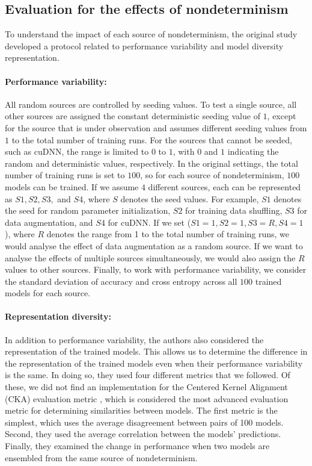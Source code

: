 \subsection{Evaluation for the effects of nondeterminism}
To understand the impact of each source of nondeterminism, the original study developed a protocol related to performance variability and model diversity representation. 
\paragraph{Performance variability:}
All random sources are controlled by seeding values. To test a single source, all other sources are assigned the constant deterministic seeding value of $1$, except for the source that is under observation and assumes different seeding values from $1$ to the total number of training runs. For the sources that cannot be seeded, such as cuDNN, the range is limited to $0$ to $1$, with $0$ and $1$ indicating the random and deterministic values, respectively. In the original settings, the total number of training runs is set to $100$, so for each source of nondeterminism, $100$ models can be trained. If we assume $4$ different sources, each can be represented as $S1, S2, S3,$ and $S4$, where $S$ denotes the seed values. For example, $S1$ denotes the seed for random parameter initialization, $S2$ for training data shuffling, $S3$ for data augmentation, and $S4$ for cuDNN. If we set ($S1=1, S2=1, S3=R, S4=1$), where $R$ denotes the range from 1 to the total number of training runs, we would analyse the effect of data augmentation as a random source. If we want to analyse the effects of multiple sources simultaneously, we would also assign the $R$ values to other sources. Finally, to work with performance variability, we consider the standard deviation of accuracy and cross entropy across all $100$ trained models for each source.
\paragraph{Representation diversity:}
In addition to performance variability, the authors also considered the representation of the trained models. This allows us to determine the difference in the representation of the trained models even when their performance variability is the same. In doing so, they used four different metrics that we followed. Of these, we did not find an implementation for the Centered Kernel Alignment (CKA) evaluation metric \cite{kornblith2019similarity}, which is considered the most advanced evaluation metric for determining similarities between models. The first metric is the simplest, which uses the average disagreement between pairs of 100 models. Second, they used the average correlation between the models' predictions. Finally, they examined the change in performance when two models are ensembled from the same source of nondeterminism.
